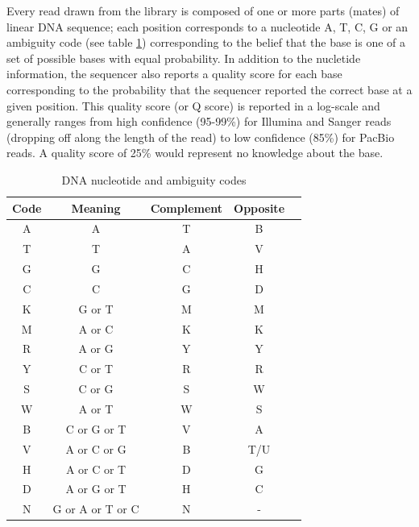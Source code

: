 \documentclass[phd,tocprelim]{cornell}
\begin{document}
Every read drawn from the library is composed of one or more parts (mates) of linear DNA sequence; each position corresponds to a nucleotide {\color{red} A}, {\color{blue} T}, {\color{MyDarkGreen} C}, {\color{orange} G} or an ambiguity code (see table \ref{ambcodes}) corresponding to the belief that the base is one of a set of possible bases with equal probability. In addition to the nucletide information, the sequencer also reports a quality score for each base corresponding to the probability that the sequencer reported the correct base at a given position. This quality score (or Q score) is reported in a log-scale and generally ranges from high confidence (95-99\%) for Illumina and Sanger reads (dropping off along the length of the read) to low confidence (85\%) for PacBio reads. A quality score of 25\% would represent no knowledge about the base.

\begin{table}[htp]
\caption{DNA nucleotide and ambiguity codes}
\label{ambcodes}
\begin{center}
    \begin{tabular}{c|c|c|c|c}
        Code & Meaning & Complement & Opposite \\
        \hline
        {\color{red} A} & {\color{red} A} & {\color{blue} T} & B \\
        {\color{blue} T} & {\color{blue} T} & {\color{red} A} & V \\
        {\color{orange} G} & {\color{orange} G} & {\color{MyDarkGreen} C} & H \\
        {\color{MyDarkGreen} C} & {\color{MyDarkGreen} C} & {\color{orange} G} & D \\
        K & {\color{orange} G} or {\color{blue} T} & M & M \\
        M & {\color{red} A} or {\color{MyDarkGreen} C} & K & K \\
        R & {\color{red} A} or {\color{orange} G} & Y & Y \\
        Y & {\color{MyDarkGreen} C} or {\color{blue} T} & R & R \\
        S & {\color{MyDarkGreen} C} or {\color{orange} G} & S & W \\
        W & {\color{red} A} or {\color{blue} T} & W & S \\
        B & {\color{MyDarkGreen} C} or {\color{orange} G} or {\color{blue} T} & V & {\color{red} A} \\
        V & {\color{red} A} or {\color{MyDarkGreen} C} or {\color{orange} G} & B & {\color{blue} T}/U \\
        H & {\color{red} A} or {\color{MyDarkGreen} C} or {\color{blue} T} & D & {\color{orange} G} \\
        D & {\color{red} A} or {\color{orange} G} or {\color{blue} T} & H & {\color{MyDarkGreen} C} \\
        N & {\color{orange} G} or {\color{red} A} or {\color{blue} T} or {\color{MyDarkGreen} C} & N & -
    \end{tabular}\
\end{center}
\end{table}
\end{document}
